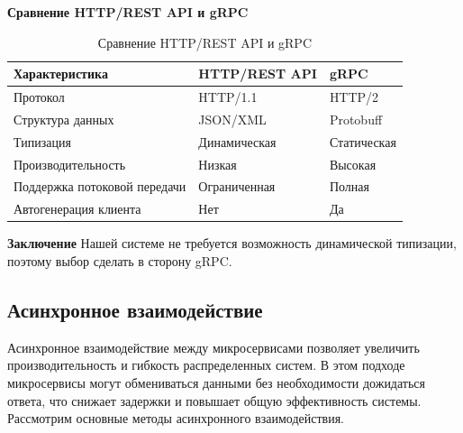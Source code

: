 \textbf{Сравнение HTTP/REST API и gRPC}
\begin{table}[h]
    \centering
    \begin{tabular}{|l|l|l|}
        \hline
        \textbf{Характеристика}           & \textbf{HTTP/REST API}                          & \textbf{gRPC}                                     \\ \hline
        Протокол                  & HTTP/1.1            & HTTP/2                             \\ \hline
        Структура данных          & JSON/XML                        & Protobuff \\ \hline
        Типизация                 & Динамическая            & Статическая  \\ \hline
        Производительность         & Низкая         & Высокая \\ \hline
        Поддержка потоковой передачи & Ограниченная                                & Полная \\ \hline
        Автогенерация клиента     & Нет & Да \\ \hline
    \end{tabular}
    \caption{Сравнение HTTP/REST API и gRPC}
\end{table}


\textbf{Заключение}
Нашей системе не требуется возможность динамической типизации, поэтому выбор сделать в сторону gRPC.

\subsection{Асинхронное взаимодействие} %

Асинхронное взаимодействие между микросервисами позволяет увеличить производительность и гибкость распределенных систем. В этом подходе микросервисы могут обмениваться данными без необходимости дожидаться ответа, что снижает задержки и повышает общую эффективность системы. Рассмотрим основные методы асинхронного взаимодействия.

